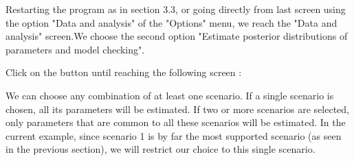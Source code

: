 Restarting the program as in section 3.3, or going directly from last screen using the option "Data and analysis" of the "Options" menu, we reach the "Data and analysis" screen.We choose the second option "Estimate posterior distributions of parameters and model checking".


Click on the \fbox{\textsf{$>>$}}  button until reaching the following screen :

We can choose any combination of at least one scenario. If a single scenario is chosen, all its parameters will be estimated. If two or more scenarios are selected, only parameters that are common to all these scenarios will be estimated. In the current example, since scenario 1 is by far the most supported scenario (as seen in the previous section), we will restrict our choice to this single scenario.

